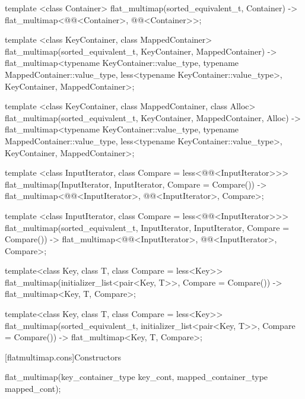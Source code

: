 \begin{addedblock}
\begin{codeblock}
{  template <class Container>
    flat_multimap(sorted_equivalent_t, Container)
      -> flat_multimap<@@<Container>, @@<Container>>;

  template <class KeyContainer, class MappedContainer>
    flat_multimap(sorted_equivalent_t, KeyContainer, MappedContainer)
      -> flat_multimap<typename KeyContainer::value_type,
                       typename MappedContainer::value_type,
                       less<typename KeyContainer::value_type>,
                       KeyContainer, MappedContainer>;

  template <class KeyContainer, class MappedContainer, class Alloc>
    flat_multimap(sorted_equivalent_t, KeyContainer, MappedContainer, Alloc)
      -> flat_multimap<typename KeyContainer::value_type,
                       typename MappedContainer::value_type,
                       less<typename KeyContainer::value_type>,
                       KeyContainer, MappedContainer>;

  template <class InputIterator, class Compare = less<@@<InputIterator>>>
    flat_multimap(InputIterator, InputIterator, Compare = Compare())
      -> flat_multimap<@@<InputIterator>, @@<InputIterator>, Compare>;

  template <class InputIterator, class Compare = less<@@<InputIterator>>>
    flat_multimap(sorted_equivalent_t, InputIterator, InputIterator,
                  Compare = Compare())
      -> flat_multimap<@@<InputIterator>, @@<InputIterator>, Compare>;

  template<class Key, class T, class Compare = less<Key>>
    flat_multimap(initializer_list<pair<Key, T>>, Compare = Compare())
      -> flat_multimap<Key, T, Compare>;

  template<class Key, class T, class Compare = less<Key>>
  flat_multimap(sorted_equivalent_t, initializer_list<pair<Key, T>>,
                Compare = Compare())
      -> flat_multimap<Key, T, Compare>;
}
\end{codeblock}

[flatmultimap.cons]{Constructors}

%
\begin{itemdecl}
flat_multimap(key_container_type key_cont, mapped_container_type mapped_cont);
\end{itemdecl}


\end{addedblock}
